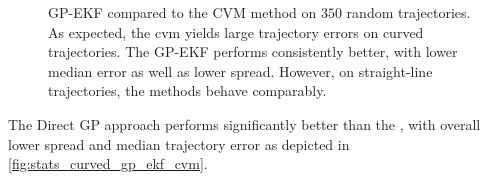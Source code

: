 \begin{figure}[h]
    \centering
    \caption{GP-EKF compared to the CVM method on $350$ random trajectories. As expected, the \acrshort{cvm} yields large trajectory errors on curved trajectories. The GP-EKF performs consistently better, with lower median error as well as lower spread. However, on straight-line trajectories, the methods behave comparably.}
    \label{fig:stats_curved_posgp_cvm}
\end{figure}
The Direct GP approach performs significantly better than the , with overall lower spread and median trajectory error as depicted in \cref{fig:stats_curved_gp_ekf_cvm}.

